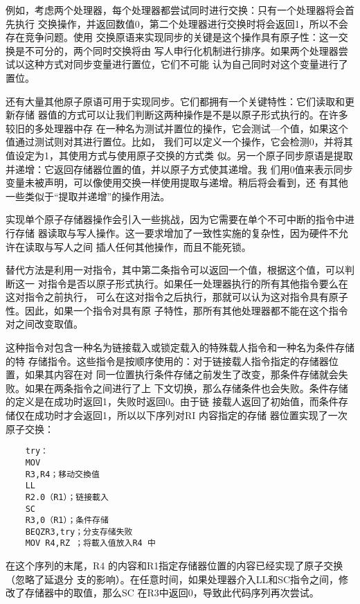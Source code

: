 例如，考虑两个处理器，每个处理器都尝试同时进行交换：只有一个处理器将会首先执行
交换操作，并返回数值0，第二个处理器进行交换时将会返回1，所以不会存在竞争问题。使用
交换原语来实现同步的关键是这个操作具有原子性：这一交换是不可分的，两个同时交换将由
写人申行化机制进行排序。如果两个处理器尝试以这种方式对同步变量进行置位，它们不可能
认为自己同时对这个变量进行了置位。

还有大量其他原子原语可用于实现同步。它们都拥有一个关键特性：它们读取和更新存储
器值的方式可以让我们判断这两种操作是不是以原子形式执行的。在许多较旧的多处理器中存
在一种名为测试并置位的操作，它会测试—个值，如果这个值通过测试则对其进行置位。比如，
我们可以定义一个操作，它会检测0，并将其值设定为1，其使用方式与使用原子交换的方式类
似。另一个原子同步原语是提取并递增：它返回存储器位置的值，并以原子方式使其递增。我
们用0值来表示同步变量未被声明，可以像使用交换一样使用提取与递增。稍后将会看到，还
有其他一些类似于“提取并递增”的操作用法。

实现单个原子存储器操作会引入一些挑战，因为它需要在单个不可中断的指令中进行存储
器读取与写人操作。这一要求增加了一致性实施的复杂性，因为硬件不允许在读取与写人之间
插人任何其他操作，而且不能死锁。

替代方法是利用一对指令，其中第二条指令可以返回一个值，根据这个值，可以判断这一
对指令是否以原子形式执行。如果任一处理器执行的所有其他指令要么在这对指令之前执行，
可么在这对指令之后执行，那就可以认为这对指令具有原子性。因此，如果一个指令对具有原
子特性，那所有其他处理器都不能在这个指令对之间改变取值。

这种指令对包含一种名为链接载入或锁定载入的特殊载人指令和一种名为条件存储的特
存储指令。这些指令是按顺序使用的：对于链接载人指令指定的存储器位置，如果其内容在对
同一位置执行条件存储之前发生了改变，那条件存储就会失败。如果在两条指令之间进行了上
下文切换，那么存储条件也会失败。条件存储的定义是在成功时返回1，失败时返回0。由于链
接载人返回了初始值，而条件存储仅在成功时才会返回1，所以以下序列对RI 内容指定的存储
器位置实现了一次原子交换：

\begin{verbatim}
    try：
    MOV
    R3,R4；移动交換值
    LL
    R2.0（R1）；链接載入
    SC
    R3,0（R1）；条件存储
    BEQZR3,try；分支存储失败
    MOV R4,RZ ；将載入值放入R4 中
\end{verbatim}

在这个序列的末尾，R4 的内容和R1指定存储器位置的内容已经实现了原子交换（忽略了延退分
支的影响）。在任意时间，如果处理器介入LL和SC指令之间，修改了存储器中的取值，那么SC
在R3中返回0，导致此代码序列再次尝试。

